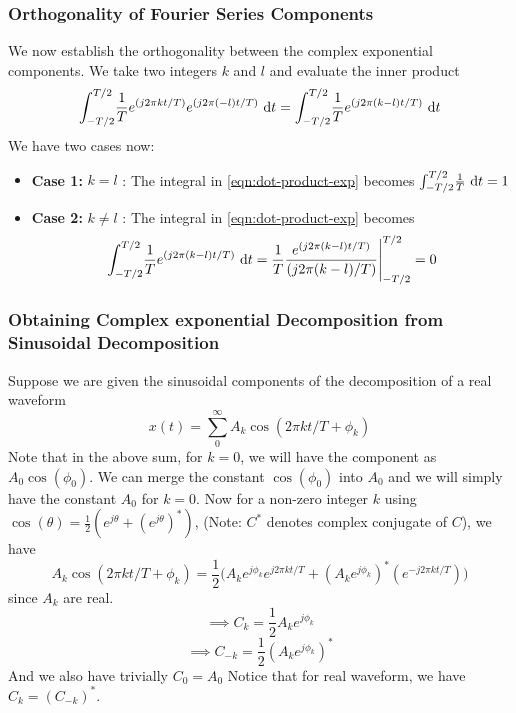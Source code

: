 \subsubsection{Orthogonality of Fourier Series Components}
We now establish the orthogonality between the complex exponential components.
We take two integers $k$ and $l$ and evaluate the inner product
\begin{equation}\label{eqn:dot-product-exp}
\int_{-T/2}^{T/2} \! {\frac{1}{T}e^{(j2\pi kt/T)}e^{(j2\pi (-l)t/T)}} \ \dm t = \int_{-T/2}^{T/2} \! {\frac{1}{T}e^{(j2\pi (k-l)t/T)}} \ \dm t
\end{equation}
We have two cases now:
\begin{itemize}
\item {\textbf{Case 1:}} $k=l$ : The integral in \ref{eqn:dot-product-exp} becomes $\int_{-T/2}^{T/2} \! \frac{1}{T} \ \mathrm{d} t = 1$
\item {\textbf{Case 2:}} $k \neq l$ : The integral in \ref{eqn:dot-product-exp} becomes
\begin{equation*}
	\int_{-T/2}^{T/2} \! {\frac{1}{T}e^{(j2\pi (k-l)t/T)}} \ \mathrm{d} t = \frac{1}{T}\frac{e^{(j2\pi (k-l)t/T)}}{(j2\pi (k-l)/T)}\Bigg|_{-T/2}^{T/2} = 0
\end{equation*}
\end{itemize}
\subsubsection{Obtaining Complex exponential Decomposition from Sinusoidal Decomposition}
Suppose we are given the sinusoidal components of the decomposition of a real waveform $$x(t) = \sum_{0}^{\infty}A_{k}\cos(2\pi kt/T + \phi_{k})$$
Note that in the above sum, for $k = 0$, we will have the component as $A_{0}\cos(\phi_{0})$. We can merge the constant $\cos(\phi_{0})$ into $A_{0}$ and we will simply have the constant $A_{0}$ for $k = 0$.
Now for a non-zero integer $k$ using $\cos(\theta) = \frac{1}{2}(e^{j\theta} + (e^{j\theta})^{*})$, (Note: $C^{*}$ denotes complex conjugate of $C$), we have $$A_{k}\cos(2\pi kt/T + \phi_{k}) = \frac{1}{2}\Bigg(A_{k}e^{j\phi_{k}}e^{j2\pi kt/T} + (A_{k}e^{j\phi_{k}})^{*} (e^{-j2\pi kt/T})\Bigg)$$
since $A_k$ are real.
$$\implies C_{k} = \frac{1}{2}A_{k}e^{j\phi_{k}}$$
$$\implies C_{-k} = \frac{1}{2}(A_{k}e^{j\phi_{k}})^{*}$$
And we also have trivially $C_{0} = A_{0}$
Notice that for real waveform, we have $C_{k} = (C_{-k})^{*}$.
